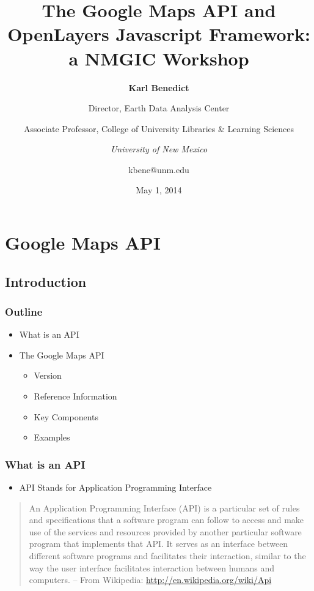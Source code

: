 \documentclass[]{article}
\title{The Google Maps API and OpenLayers Javascript Framework: a NMGIC
Workshop}
\author{\textbf{Karl Benedict} \and Director, Earth Data Analysis Center \and Associate Professor, College of University Libraries \& Learning
Sciences \and \emph{University of New Mexico} \and kbene@unm.edu}
\date{May 1, 2014}
\begin{document}
\maketitle

{
\hypersetup{linkcolor=black}
\setcounter{tocdepth}{3}
\tableofcontents
}
\section{Google Maps API}\label{google-maps-api}

\subsection{Introduction}\label{introduction}

\subsubsection{Outline}\label{outline}

\begin{itemize}
\itemsep1pt\parskip0pt
\item
  What is an API
\item
  The Google Maps API

  \begin{itemize}
  \itemsep1pt\parskip0pt
  \item
    Version
  \item
    Reference Information
  \item
    Key Components
  \item
    Examples
  \end{itemize}
\end{itemize}

\subsubsection{What is an API}\label{what-is-an-api}

\begin{itemize}
\itemsep1pt\parskip0pt
\item
  API Stands for Application Programming Interface
\end{itemize}

\begin{quote}
An Application Programming Interface (API) is a particular set of rules
and specifications that a software program can follow to access and make
use of the services and resources provided by another particular
software program that implements that API. It serves as an interface
between different software programs and facilitates their interaction,
similar to the way the user interface facilitates interaction between
humans and computers. -- From Wikipedia:
\url{http://en.wikipedia.org/wiki/Api}
\end{quote}
\end{document}
